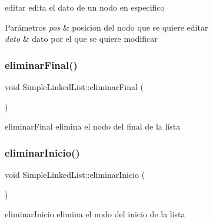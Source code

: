 editar edita el dato de un nodo en especifico 


\begin{DoxyParams}{Parámetros}
{\em pos} & posicion del nodo que se quiere editar \\
\hline
{\em dato} & dato por el que se quiere modificar \\
\hline
\end{DoxyParams}
\mbox{\label{class_simple_linked_list_aabf382c8f9262f7b23718f60c1ef724d}} 
\subsubsection{\texorpdfstring{eliminar\+Final()}{eliminarFinal()}}
{\footnotesize\ttfamily void Simple\+Linked\+List\+::eliminar\+Final (\begin{DoxyParamCaption}{ }\end{DoxyParamCaption})\hspace{0.3cm}{\ttfamily [inline]}}



eliminar\+Final elimina el nodo del final de la lista 

\mbox{\label{class_simple_linked_list_a398074e6af83b72302153bef22e5a899}} 
\subsubsection{\texorpdfstring{eliminar\+Inicio()}{eliminarInicio()}}
{\footnotesize\ttfamily void Simple\+Linked\+List\+::eliminar\+Inicio (\begin{DoxyParamCaption}{ }\end{DoxyParamCaption})\hspace{0.3cm}{\ttfamily [inline]}}



eliminar\+Inicio elimina el nodo del inicio de la lista 

\mbox{\label{class_simple_linked_list_a260b6de5d5c73652fa016c3b63222bae}} 
